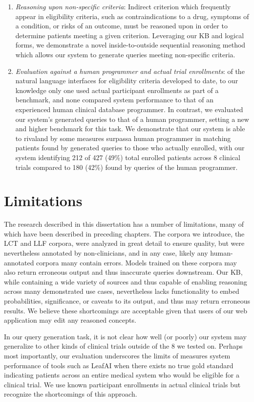 \documentclass[../main.tex]{subfiles}
\begin{document}
\begin{enumerate}
    \item \textit{Reasoning upon non-specific criteria}: Indirect criterion which frequently appear in eligibility criteria, such as contraindications to a drug, symptoms of a condition, or risks of an outcome, must be reasoned upon in order to determine patients meeting a given criterion. Leveraging our KB and logical forms, we demonstrate a novel inside-to-outside sequential reasoning method which allows our system to generate queries meeting non-specific criteria.
    \item \textit{Evaluation against a human programmer and actual trial enrollments}: of the natural language interfaces for eligibility criteria developed to date, to our knowledge only one used actual participant enrollments as part of a benchmark, and none compared system performance to that of an experienced human clinical database programmer. In contrast, we evaluated our system's generated queries to that of a human programmer, setting a new and higher benchmark for this task. We demonstrate that our system is able to rival\textemdash and by some measures surpass\textemdash a human programmer in matching patients found by generated queries to those who actually enrolled, with our system identifying 212 of 427 (49\%) total enrolled patients across 8 clinical trials compared to 180 (42\%) found by queries of the human programmer.
\end{enumerate}

\section{Limitations}

The research described in this dissertation has a number of limitations, many of which have been described in preceding chapters. The corpora we introduce, the LCT and LLF corpora, were analyzed in great detail to ensure quality, but were nevertheless annotated by non-clinicians, and in any case, likely any human-annotated corpora many contain errors. Models trained on these corpora may also return erroneous output and thus inaccurate queries downstream. Our KB, while containing a wide variety of sources and thus capable of enabling reasoning across many demonstrated use cases, nevertheless lacks functionality to embed probabilities, significance, or caveats to its output, and thus may return erroneous results. We believe these shortcomings are acceptable given that users of our web application may edit any reasoned concepts. 

In our query generation task, it is not clear how well (or poorly) our system may generalize to other kinds of clinical trials outside of the 8 we tested on. Perhaps most importantly, our evaluation underscores the limits of measures system performance of tools such as LeafAI when there exists no true gold standard indicating patients across an entire medical system who would be eligible for a clinical trial. We use known participant enrollments in actual clinical trials but recognize the shortcomings of this approach.
\end{document}
